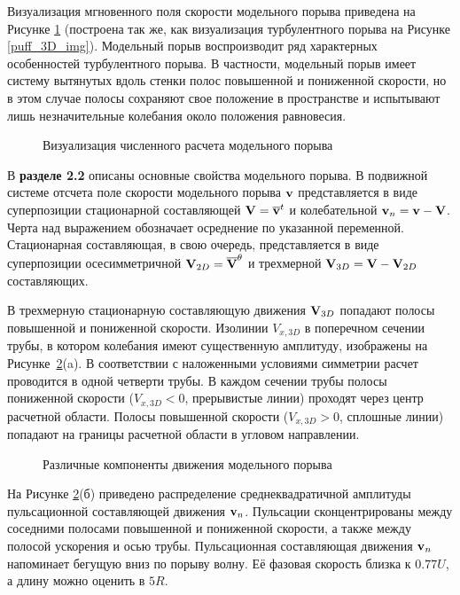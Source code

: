 Визуализация мгновенного поля скорости модельного порыва приведена на Рисунке \ref{edge_3D_img} (построена так же, как визуализация турбулентного порыва на Рисунке \ref{puff_3D_img}). Модельный порыв воспроизводит ряд характерных особенностей турбулентного порыва. В частности, модельный порыв имеет систему вытянутых вдоль стенки полос повышенной и пониженной скорости, но в этом случае полосы сохраняют свое положение в пространстве и испытывают лишь незначительные колебания около положения равновесия. 

\begin{figure}
\caption{Визуализация численного расчета модельного порыва}
\label{edge_3D_img}
\end{figure}

В \textbf{разделе 2.2} описаны основные свойства модельного порыва. В подвижной системе отсчета поле скорости модельного порыва $\mathbf{v}$ представляется в виде суперпозиции стационарной составляющей $\mathbf{V} = \overline{\mathbf{v}}^t$ и колебательной $\mathbf{v}_n = \mathbf{v} - \mathbf{V}$. Черта над выражением обозначает осреднение по указанной переменной. Стационарная составляющая, в свою очередь, представляется в виде суперпозиции осесимметричной $\mathbf{V}_{2D} = \overline{\mathbf{V}}^{\theta}$ и трехмерной $\mathbf{V}_{3D} = \mathbf{V} - \mathbf{V}_{2D}$ составляющих. 

В трехмерную стационарную составляющую движения $\mathbf{V}_{3D}$ попадают полосы повышенной и пониженной скорости. Изолинии $V_{x, 3D}$ в поперечном сечении трубы, в котором колебания имеют существенную амплитуду, изображены на Рисунке~\ref{mp_cs_pic}(a). В соответствии с наложенными условиями симметрии расчет проводится в одной четверти трубы. В каждом сечении трубы полосы пониженной скорости ($V_{x,3D} < 0$, прерывистые линии) проходят через центр расчетной области. Полосы повышенной скорости ($V_{x,3D} > 0$, сплошные линии) попадают на границы расчетной области в угловом направлении. 

\begin{figure}
\caption{Различные компоненты движения модельного порыва}
\label{mp_cs_pic}
\end{figure}

На Рисунке \ref{mp_cs_pic}(б) приведено распределение среднеквадратичной амплитуды пульсационной составляющей движения $\mathbf{v}_n$. Пульсации сконцентрированы между соседними полосами повышенной и пониженной скорости, а также между полосой ускорения и осью трубы. Пульсационная составляющая движения $\mathbf{v}_n$ напоминает бегущую вниз по порыву волну. Её фазовая скорость близка к $0.77U$, а длину можно оценить в $5R$. 

